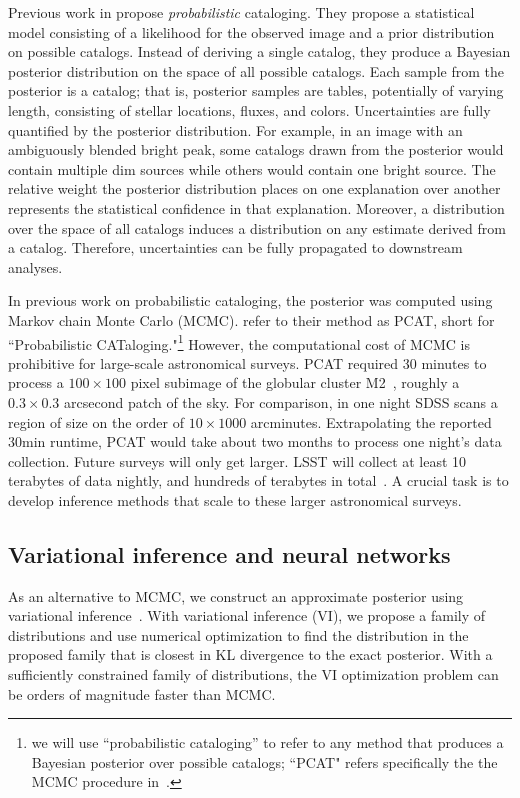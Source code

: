Previous work in \cite{Brewer_2013, Portillo_2017, Feder_2019}
propose {\itshape probabilistic} cataloging.
They propose a statistical model consisting of a likelihood for the observed image and a prior distribution on possible catalogs. Instead of deriving a single catalog, they produce a Bayesian posterior distribution on the space of all possible catalogs. 
Each sample from the posterior is a catalog; that is, posterior samples are tables, potentially of varying length, consisting of stellar locations, fluxes, and colors. Uncertainties are fully quantified by the posterior distribution. For example, in an image with an ambiguously blended bright peak, some catalogs drawn from the posterior would contain multiple dim sources while others would contain one bright source. The relative weight the posterior distribution places on one explanation over another represents the statistical confidence in that explanation. Moreover, a distribution over the space of all catalogs induces a distribution on any estimate derived from a catalog. Therefore, uncertainties can be fully propagated to downstream analyses.  

In previous work on probabilistic cataloging, the posterior was computed using
Markov chain Monte Carlo (MCMC).
\cite{Portillo_2017, Feder_2019} refer to their method as PCAT, short for ``Probabilistic CATaloging."\footnote{
we will 
use ``probabilistic cataloging'' to refer to any method that produces a Bayesian posterior over possible catalogs; ``PCAT" refers specifically the the MCMC procedure in~\cite{Portillo_2017, Feder_2019}. }
However, the computational cost of MCMC is prohibitive for
large-scale astronomical surveys. PCAT required 30 minutes to process a $100\times 100$ pixel subimage of the globular cluster M2~\cite{Feder_2019}, roughly a $0.3\times0.3$ arcsecond patch of the sky.
For comparison, in one night SDSS scans a region of size on the order of $10 \times 1000$ arcminutes. Extrapolating the reported 30min runtime, PCAT would take about two months to process one night's data collection.
Future surveys will only get larger. LSST will collect at least 10 terabytes of data nightly, and hundreds of terabytes in total~\cite{LSST_about}. A crucial task is to develop inference methods that scale to these larger astronomical surveys. 

\subsection{Variational inference and neural networks}
As an alternative to MCMC, we construct an approximate posterior using variational inference~\cite{Blei_2017_vi_review,Jordan_intro_vi, Wainwrite_graph_models_vi}.
With variational inference (VI), we propose a family of distributions and use numerical optimization to find the distribution 
in the proposed family that is closest 
in KL divergence to the exact posterior. 
With a sufficiently constrained family of distributions, the VI optimization problem can be orders of magnitude faster than MCMC. 

